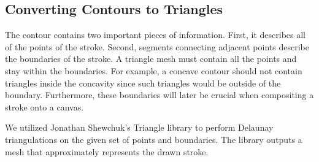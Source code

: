 \documentclass[review]{acmsiggraph}
\begin{document}


\subsection{Converting Contours to Triangles}
The contour contains two important pieces of information. First, it describes all of the points of the stroke.
Second, segments connecting adjacent points describe the boundaries of the stroke. 
A triangle mesh must contain all the points and stay
within the boundaries. For example, a concave contour should not contain triangles inside the concavity since such triangles
would be outside of the boundary.
Furthermore, these boundaries will later be crucial when compositing a stroke onto a canvas.

We utilized Jonathan Shewchuk's Triangle library to perform Delaunay triangulations
on the given set of points and boundaries. The library outputs a mesh that
approximately represents the drawn stroke.
\end{document}

